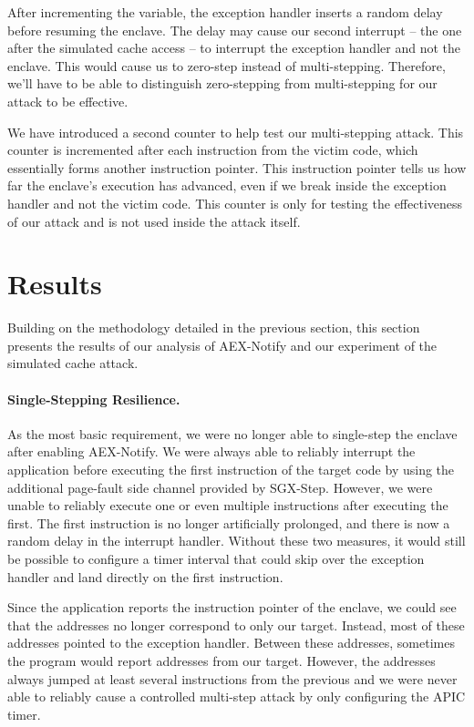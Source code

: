 \documentclass{llncs}
\begin{document}
After incrementing the variable, the exception handler inserts a random delay
before resuming the enclave.
The delay may cause our second interrupt -- the one after the simulated cache
access -- to interrupt the exception handler and not the enclave.
This would cause us to zero-step instead of multi-stepping.
Therefore, we'll have to be able to distinguish zero-stepping from
multi-stepping for our attack to be effective.

We have introduced a second counter to help test our multi-stepping attack.
This counter is incremented after each instruction from the victim code,
which essentially forms another instruction pointer.
This instruction pointer tells us how far the enclave's execution has advanced,
even if we break inside the exception handler and not the victim code.
This counter is only for testing the effectiveness of our attack
and is not used inside the attack itself.

\section{Results}

Building on the methodology detailed in the previous section, this section presents
the results of our analysis of AEX-Notify and our experiment of the simulated cache attack.

\paragraph{Single-Stepping Resilience.}
As the most basic requirement,
we were no longer able to single-step the enclave after enabling AEX-Notify.
We were always able to reliably interrupt the application
before executing the first instruction of the target code
by using the additional page-fault side channel provided by SGX-Step.
However, we were unable to reliably execute one or
even multiple instructions after executing the first.
The first instruction is no longer artificially prolonged,
and there is now a random delay in the interrupt handler.
Without these two measures,
it would still be possible to configure a timer interval
that could skip over the exception handler and land directly on the first instruction.

Since the application reports the instruction pointer of the enclave,
we could see that the addresses no longer correspond to only our target.
Instead, most of these addresses pointed to the exception handler.
Between these addresses, sometimes the program would report addresses from our target.
However, the addresses always jumped at least several instructions from the previous
and we were never able to reliably cause a controlled multi-step attack
by only configuring the APIC timer.
\end{document}
